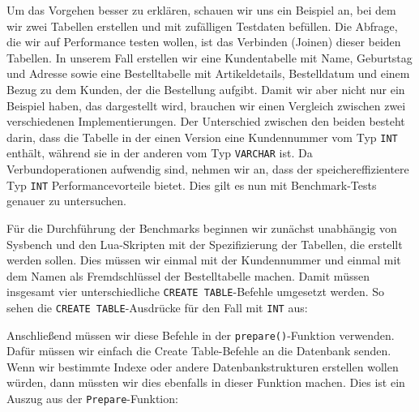 Um das Vorgehen besser zu erklären, schauen wir uns ein Beispiel an, bei dem wir zwei Tabellen erstellen und mit zufälligen Testdaten befüllen.
Die Abfrage, die wir auf Performance testen wollen, ist das Verbinden (Joinen) dieser beiden Tabellen.
In unserem Fall erstellen wir eine Kundentabelle mit Name, Geburtstag und Adresse sowie eine Bestelltabelle mit Artikeldetails, Bestelldatum und einem Bezug zu dem Kunden, der die Bestellung aufgibt.
Damit wir aber nicht nur ein Beispiel haben, das dargestellt wird, brauchen wir einen Vergleich zwischen zwei verschiedenen Implementierungen.
Der Unterschied zwischen den beiden besteht darin, dass die Tabelle in der einen Version eine Kundennummer vom Typ \texttt{INT} enthält, während sie in der anderen vom Typ \texttt{VARCHAR} ist.
Da Verbundoperationen aufwendig sind, nehmen wir an, dass der speichereffizientere Typ \texttt{INT} Performancevorteile bietet.
Dies gilt es nun mit Benchmark-Tests genauer zu untersuchen.

Für die Durchführung der Benchmarks beginnen wir zunächst unabhängig von Sysbench und den Lua-Skripten mit der Spezifizierung der Tabellen, die erstellt werden sollen.
Dies müssen wir einmal mit der Kundennummer und einmal mit dem Namen als Fremdschlüssel der Bestelltabelle machen.
Damit müssen insgesamt vier unterschiedliche \texttt{CREATE TABLE}-Befehle umgesetzt werden.
So sehen die \texttt{CREATE TABLE}-Ausdrücke für den Fall mit \texttt{INT} aus:

\vspace{-10pt}

\vspace{-5pt}


\vspace{-5pt}

Anschließend müssen wir diese Befehle in der \texttt{prepare()}-Funktion verwenden.
Dafür müssen wir einfach die Create Table-Befehle an die Datenbank senden.
Wenn wir bestimmte Indexe oder andere Datenbankstrukturen erstellen wollen würden, dann müssten wir dies ebenfalls in dieser Funktion machen.
Dies ist ein Auszug aus der \texttt{Prepare}-Funktion:

